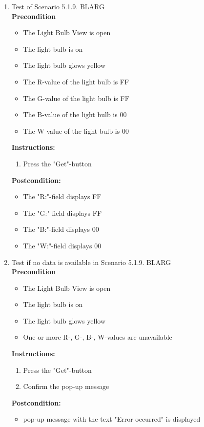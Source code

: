 \documentclass[a4paper]{article}
\newlength{\testlabellength}
\newenvironment{testlist}{\begin{enumerate}[label=\bfseries Instruction \thesubsection.\arabic* , labelindent=0pt, labelwidth=\testlabellength , leftmargin=2cm]}{\end{enumerate}}
\newenvironment{precondition}{
{\color{white}BLARG}\\ 
\textbf{Precondition}
\begin{itemize}[labelindent=0cm, labelwidth=2cm , leftmargin=1cm]
}
{\end{itemize}}
\newenvironment{instruction}{
\textbf{Instructions:}
\begin{enumerate}[label=\bfseries  \arabic*., labelindent=0cm, labelwidth=2cm , leftmargin=1cm]
}
{\end{enumerate}}
\newenvironment{postcondition}{
\textbf{Postcondition:}
\begin{itemize}[labelindent=0cm, labelwidth=2cm , leftmargin=1cm]
}
{\end{itemize}}
\begin{document}
\begin{appendices}
\begin{testlist}
	\item  Test of Scenario 5.1.9.
		\begin{precondition}
			\item The Light Bulb View is open
			\item The light bulb is on
			\item The light bulb glows yellow
			\item The R-value of the light bulb is FF
			\item The G-value of the light bulb is FF
			\item The B-value of the light bulb is 00
			\item The W-value of the light bulb is 00
		\end{precondition}
		\begin{instruction}
			\item Press the "Get"-button
		\end{instruction}
		\begin{postcondition}
			\item The "R:"-field displays FF
			\item The "G:"-field displays FF
			\item The "B:"-field displays 00
			\item The "W:"-field displays 00
		\end{postcondition}
\newpage
	\item  Test if no data is available in Scenario 5.1.9.
		\begin{precondition}
			\item The Light Bulb View is open
			\item The light bulb is on
			\item The light bulb glows yellow
			\item One or more R-, G-, B-, W-values are unavailable
		\end{precondition}
		\begin{instruction}
			\item Press the "Get"-button
			\item Confirm the pop-up message
		\end{instruction}
		\begin{postcondition}
			\item pop-up message with the text "Error occurred" is displayed
		\end{postcondition}


\end{testlist}
\end{appendices}
\end{document}
